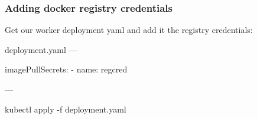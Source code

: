 	\begin{frame}
		\frametitle{Adding docker registry credentials}
		
		Get our worker deployment yaml and add it the registry credentials:
		\begin{block}{deployment.yaml}
			---
			
				imagePullSecrets:
				- name: regcred
				
			---
			
			kubectl apply -f deployment.yaml
		\end{block}
	\end{frame}


